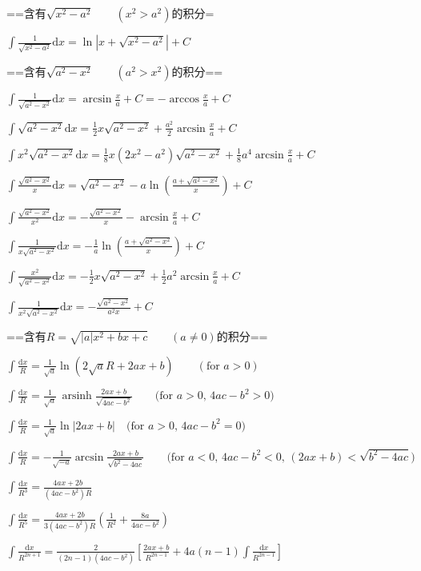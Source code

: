 ==含有$\sqrt{x^2-a^2}\qquad{(x^2>a^2)}$的积分=\par
$\int \frac{1}{\sqrt{x^2-a^2}}\mbox{d}x=\ln| x+\sqrt{x^2-a^2} | +C$\par

==含有$\sqrt{a^2-x^2}\qquad(a^2>x^2)$的积分==\par
$\int \frac{1}{\sqrt{a^2-x^2}}\mbox{d}x= \arcsin \frac{x}{a} +C = - \arccos \frac{x}{a} +C$\par
$\int\sqrt{a^2-x^2}\mbox{d}x=\frac{1}{2}x\sqrt{a^2-x^2} +\frac{a^2}{2}\arcsin\frac{x}{a}+C$\par
$\int x^2\sqrt{a^2-x^2}\mbox{d}x=\frac{1}{8}x(2x^2-a^2)\sqrt{a^2-x^2} +\frac{1}{8}a^4\arcsin\frac{x}{a}+C$\par
$\int\frac{\sqrt{a^2-x^2}}{x}\mbox{d}x=\sqrt{a^2-x^2} -a\ln\left (\frac{a+\sqrt{a^2-x^2}}{x}\right )+C$\par
$\int\frac{\sqrt{a^2-x^2}}{x^2}\mbox{d}x=-\frac{\sqrt{a^2-x^2}}{x} -\arcsin\frac{x}{a}+C$\par
$\int\frac{1}{x\sqrt{a^2-x^2}}\mbox{d}x=-\frac{1}{a}\ln\left (\frac{a+\sqrt{a^2-x^2}}{x}\right )+C$\par
$\int\frac{x^2}{\sqrt{a^2-x^2}}\mbox{d}x=-\frac{1}{2}x\sqrt{a^2-x^2}+\frac{1}{2}a^2\arcsin\frac{x}{a}+C$\par
$\int\frac{1}{x^2\sqrt{a^2-x^2}}\mbox{d}x=-\frac{\sqrt{a^2-x^2}}{a^2x}+C$\par
==含有$R=\sqrt{|a|x^2+bx+c}\qquad(a\ne0)$的积分==\par
$\int\frac{\mbox{d}x}{R} = \frac{1}{\sqrt{a}}\ln\left(2\sqrt{a}R+2ax+b\right)\qquad(\mbox{for }a>0)$\par
$\int\frac{\mbox{d}x}{R} = \frac{1}{\sqrt{a}}\,\operatorname{arsinh}\frac{2ax+b}{\sqrt{4ac-b^2}} \qquad \mbox{(for }a>0\mbox{, }4ac-b^2>0\mbox{)}$\par
$\int\frac{\mbox{d}x}{R} = \frac{1}{\sqrt{a}}\ln|2ax+b| \quad \mbox{(for }a>0\mbox{, }4ac-b^2=0\mbox{)}$\par
$\int\frac{\mbox{d}x}{R} = -\frac{1}{\sqrt{-a}}\arcsin\frac{2ax+b}{\sqrt{b^2-4ac}} \qquad \mbox{(for }a<0\mbox{, }4ac-b^2<0\mbox{, }\left(2ax+b\right)<\sqrt{b^2-4ac}\mbox{)}$\par
$\int\frac{\mbox{d}x}{R^3} = \frac{4ax+2b}{(4ac-b^2)R}$\par
$\int\frac{\mbox{d}x}{R^5} = \frac{4ax+2b}{3(4ac-b^2)R}\left(\frac{1}{R^2}+\frac{8a}{4ac-b^2}\right)$\par
$\int\frac{\mbox{d}x}{R^{2n+1}} = \frac{2}{(2n-1)(4ac-b^2)}\left[\frac{2ax+b}{R^{2n-1}}+4a(n-1)\int\frac{\mbox{d}x}{R^{2n-1}}\right]$\par
